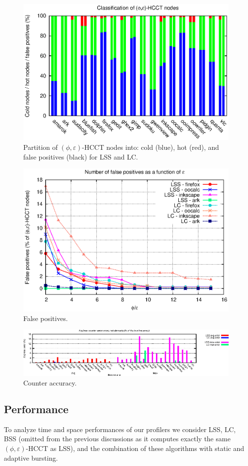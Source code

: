 \documentclass[preprint]{sigplanconf}
\begin{document}
\begin{figure}[t]
\center\includegraphics[width=7.5 cm]{charts/false-positives.eps}
\caption{Partition of $(\phi,\varepsilon)$-HCCT nodes into: cold (blue), hot (red), and false positives (black) for LSS and LC.}
\label{fig:falsePositives}
\end{figure} 

\begin{figure}[t]
\center\includegraphics[width=7.4 cm]{charts/false-positives-epsilon.eps}
\caption{False positives.}
\label{fig:falsePositivesEpsilon}
\end{figure} 

\begin{figure}[t]
\center\includegraphics[width=8.2 cm]{charts/counter-error.eps}
\caption{Counter accuracy.}
\label{fig:counterAccuracy}
\end{figure} 


\subsection{Performance}
\label{ss:performance}

To analyze time and space performances of our profilers we consider LSS, LC, BSS (omitted from the previous discussions as it computes exactly the same $(\phi,\varepsilon)$-HCCT as LSS), and the combination of these algorithms with static and adaptive bursting.
\end{document}
